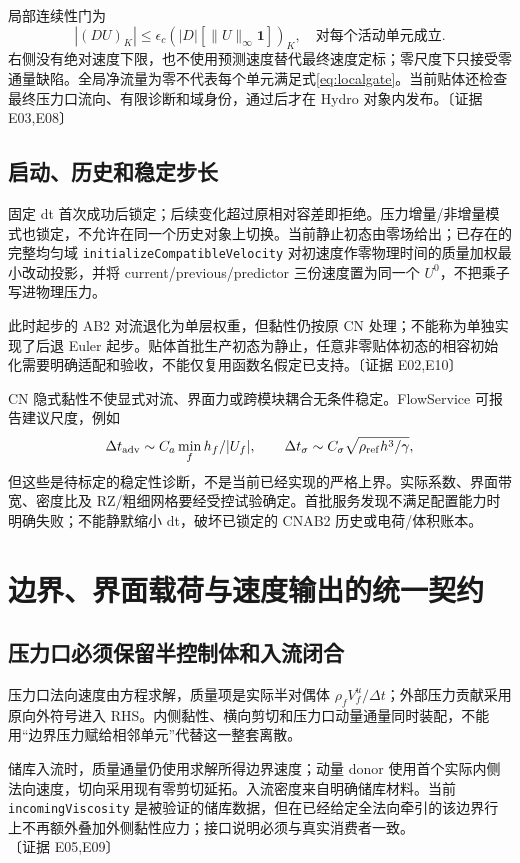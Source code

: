 \documentclass[UTF8,a4paper,11pt,fontset=fandol]{ctexart}
\newcommand{\code}[1]{\nolinkurl{#1}}
\newcommand{\ev}[1]{{\small\color{muted}〔证据 #1〕}}
\newcommand{\dt}{\Delta t}\newcommand{\jump}[1]{[\![#1]\!]}
\begin{document}
局部连续性门为
\begin{equation}
 |(DU)_K|\le\epsilon_c\left(|D|[\|U\|_\infty\bm1]\right)_K,
 \quad\text{对每个活动单元成立}.\label{eq:localgate}
\end{equation}
右侧没有绝对速度下限，也不使用预测速度替代最终速度定标；零尺度下只接受零通量缺陷。全局净流量为零不代表每个单元满足式\eqref{eq:localgate}。当前贴体还检查最终压力口流向、有限诊断和域身份，通过后才在 Hydro 对象内发布。\ev{E03,E08}

\subsection{启动、历史和稳定步长}
固定 dt 首次成功后锁定；后续变化超过原相对容差即拒绝。压力增量/非增量模式也锁定，不允许在同一个历史对象上切换。当前静止初态由零场给出；已存在的完整均匀域 \code{initializeCompatibleVelocity} 对初速度作零物理时间的质量加权最小改动投影，并将 current/previous/predictor 三份速度置为同一个 $U^0$，不把乘子写进物理压力。

此时起步的 AB2 对流退化为单层权重，但黏性仍按原 CN 处理；不能称为单独实现了后退 Euler 起步。贴体首批生产初态为静止，任意非零贴体初态的相容初始化需要明确适配和验收，不能仅复用函数名假定已支持。\ev{E02,E10}

CN 隐式黏性不使显式对流、界面力或跨模块耦合无条件稳定。FlowService 可报告建议尺度，例如
\[
 \dt_{\rm adv}\sim C_a\min_f h_f/|U_f|,\qquad
 \dt_\sigma\sim C_\sigma\sqrt{\rho_{\rm ref}h^3/\gamma},
\]
但这些是待标定的稳定性诊断，不是当前已经实现的严格上界。实际系数、界面带宽、密度比及 RZ/粗细网格要经受控试验确定。首批服务发现不满足配置能力时明确失败；不能静默缩小 dt，破坏已锁定的 CNAB2 历史或电荷/体积账本。

\section{边界、界面载荷与速度输出的统一契约}
\subsection{压力口必须保留半控制体和入流闭合}
压力口法向速度由方程求解，质量项是实际半对偶体 $\rho_fV_f^u/\dt$；外部压力贡献采用原向外符号进入 RHS。内侧黏性、横向剪切和压力口动量通量同时装配，不能用“边界压力赋给相邻单元”代替这一整套离散。

储库入流时，质量通量仍使用求解所得边界速度；动量 donor 使用首个实际内侧法向速度，切向采用现有零剪切延拓。入流密度来自明确储库材料。当前 \code{incomingViscosity} 是被验证的储库数据，但在已经给定全法向牵引的该边界行上不再额外叠加外侧黏性应力；接口说明必须与真实消费者一致。\ev{E05,E09}
\end{document}
